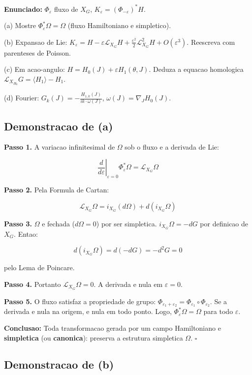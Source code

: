 \documentclass[12pt,a4paper,oneside]{article}
\begin{document}
\textbf{Enunciado:} $\Phi_\varepsilon$ fluxo de $X_G$,
$K_\varepsilon = (\Phi_{-\varepsilon})^*H$.

(a) Mostre $\Phi_\varepsilon^*\Omega = \Omega$ (fluxo Hamiltoniano e simpletico).

(b) Expansao de Lie: $K_\varepsilon = H - \varepsilon\mathcal{L}_{X_G}H +
\frac{\varepsilon^2}{2}\mathcal{L}^2_{X_G}H + O(\varepsilon^3)$. Reescreva
com parenteses de Poisson.

(c) Em acao-angulo: $H = H_0(J) + \varepsilon H_1(\theta,J)$. Deduza a
equacao homologica $\mathcal{L}_{X_{H_0}}G = \langle H_1\rangle - H_1$.

(d) Fourier: $G_k(J) = -\frac{H_{1,k}(J)}{i k\cdot\omega(J)}$,
$\omega(J) = \nabla_J H_0(J)$.

\subsection*{Demonstracao de (a)}

\textbf{Passo 1.} A variacao infinitesimal de $\Omega$ sob o fluxo e a
derivada de Lie:

$$\left.\frac{d}{d\varepsilon}\right|_{\varepsilon=0}
\Phi_\varepsilon^*\Omega = \mathcal{L}_{X_G}\Omega$$

\textbf{Passo 2.} Pela Formula de Cartan:

$$\mathcal{L}_{X_G}\Omega = i_{X_G}(d\Omega) + d(i_{X_G}\Omega)$$

\textbf{Passo 3.} $\Omega$ e fechada ($d\Omega = 0$) por ser simpletica.
$i_{X_G}\Omega = -dG$ por definicao de $X_G$. Entao:

$$d(i_{X_G}\Omega) = d(-dG) = -d^2G = 0$$

pelo Lema de Poincare.

\textbf{Passo 4.} Portanto $\mathcal{L}_{X_G}\Omega = 0$. A derivada e nula
em $\varepsilon = 0$.

\textbf{Passo 5.} O fluxo satisfaz a propriedade de grupo:
$\Phi_{\varepsilon_1+\varepsilon_2} = \Phi_{\varepsilon_1} \circ
\Phi_{\varepsilon_2}$. Se a derivada e nula na origem, e nula em todo ponto.
Logo, $\Phi_\varepsilon^*\Omega = \Omega$ para todo $\varepsilon$.

\textbf{Conclusao:} Toda transformacao gerada por um campo Hamiltoniano e
\textbf{simpletica} (ou \textbf{canonica}): preserva a estrutura simpletica
$\Omega$. $\square$

\subsection*{Demonstracao de (b)}
\end{document}
